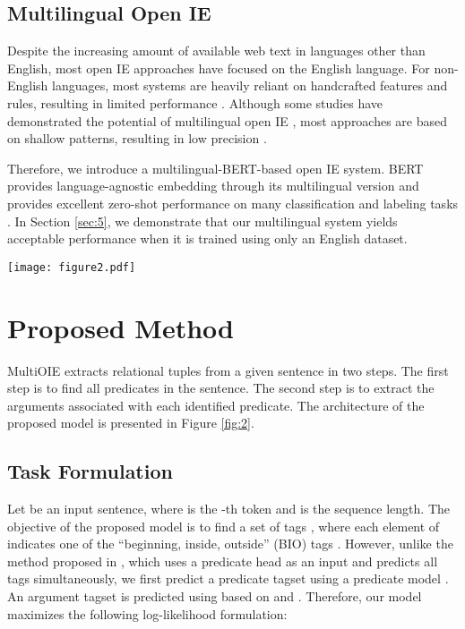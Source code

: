 \documentclass[11pt,a4paper]{article}
\begin{document}
\subsection{Multilingual Open IE}
\label{sec:2.2}
Despite the increasing amount of available web text in languages other than English, most open IE approaches have focused on the English language.
For non-English languages, most systems are heavily reliant on handcrafted features and rules, resulting in limited performance \citep{zhila-gelbukh-2014-open,Oliveira2019DptOIEAP,8903488,GUARASCI2020112954}.
Although some studies have demonstrated the potential of multilingual open IE \citep{faruqui-kumar-2015-multilingual,10.1007/978-3-319-23485-4_72,white-EtAl:2016:EMNLP2016}, most approaches are based on shallow patterns, resulting in low precision \citep{Claro_2019}.

Therefore, we introduce a multilingual-BERT-based open IE system.
BERT provides language-agnostic embedding through its multilingual version and provides excellent zero-shot performance on many classification and labeling tasks \citep{pires-etal-2019-multilingual,wu-dredze-2019-beto,Karthikeyan2020CrossLingualAO}.
In Section \ref{sec:5}, we demonstrate that our multilingual system yields acceptable performance when it is trained using only an English dataset.

\begin{figure*}[ht]
\texttt{[image: figure2.pdf]}
\caption
{
Architecture of MultiOIE.
After predicates are extracted using the hidden states of BERT, the hidden sequence, average vector of predicates, and position embedding are concatenated and used as inputs for multi-head attention blocks for argument extraction.
}
\label{fig:2}
\centering
\end{figure*}

\section{Proposed Method}
MultiOIE extracts relational tuples from a given sentence in two steps. 
The first step is to find all predicates in the sentence.
The second step is to extract the arguments associated with each identified predicate.
The architecture of the proposed model is presented in Figure \ref{fig:2}.

\subsection{Task Formulation}
\label{sec:task_formulation}
Let  be an input sentence, where  is the -th token and  is the sequence length.
The objective of the proposed model  is to find a set of tags , where each element of  indicates one of the “beginning, inside, outside” (BIO) tags \citep{ramshaw-marcus-1995-text}.
However, unlike the method proposed in \citet{stanovsky-etal-2018-supervised}, which uses a predicate head as an input and predicts all tags simultaneously, we first predict a predicate tagset  using a predicate model .
An argument tagset  is predicted using  based on  and .
Therefore, our model maximizes the following log-likelihood formulation:
\end{document}
